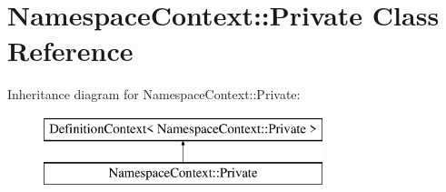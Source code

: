 \hypertarget{class_namespace_context_1_1_private}{}\section{Namespace\+Context\+::Private Class Reference}
\label{class_namespace_context_1_1_private}
Inheritance diagram for Namespace\+Context\+::Private\+:\begin{figure}[H]
\begin{center}
\leavevmode
\includegraphics[height=2.000000cm]{class_namespace_context_1_1_private}
\end{center}
\end{figure}

